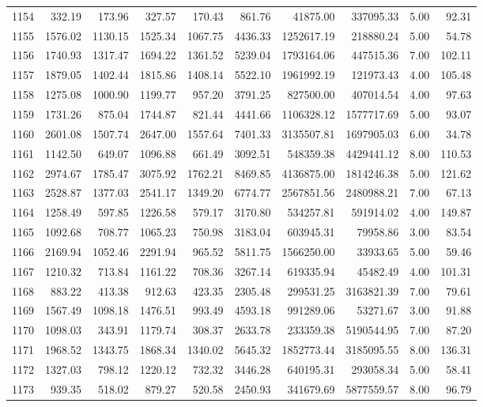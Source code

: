 \begin{tabular}{lrrrrrrrrr}
1154 & 332.19 & 173.96 & 327.57 & 170.43 & 861.76 & 41875.00 & 337095.33 & 5.00 & 92.31 \\
1155 & 1576.02 & 1130.15 & 1525.34 & 1067.75 & 4436.33 & 1252617.19 & 218880.24 & 5.00 & 54.78 \\
1156 & 1740.93 & 1317.47 & 1694.22 & 1361.52 & 5239.04 & 1793164.06 & 447515.36 & 7.00 & 102.11 \\
1157 & 1879.05 & 1402.44 & 1815.86 & 1408.14 & 5522.10 & 1961992.19 & 121973.43 & 4.00 & 105.48 \\
1158 & 1275.08 & 1000.90 & 1199.77 & 957.20 & 3791.25 & 827500.00 & 407014.54 & 4.00 & 97.63 \\
1159 & 1731.26 & 875.04 & 1744.87 & 821.44 & 4441.66 & 1106328.12 & 1577717.69 & 5.00 & 93.07 \\
1160 & 2601.08 & 1507.74 & 2647.00 & 1557.64 & 7401.33 & 3135507.81 & 1697905.03 & 6.00 & 34.78 \\
1161 & 1142.50 & 649.07 & 1096.88 & 661.49 & 3092.51 & 548359.38 & 4429441.12 & 8.00 & 110.53 \\
1162 & 2974.67 & 1785.47 & 3075.92 & 1762.21 & 8469.85 & 4136875.00 & 1814246.38 & 5.00 & 121.62 \\
1163 & 2528.87 & 1377.03 & 2541.17 & 1349.20 & 6774.77 & 2567851.56 & 2480988.21 & 7.00 & 67.13 \\
1164 & 1258.49 & 597.85 & 1226.58 & 579.17 & 3170.80 & 534257.81 & 591914.02 & 4.00 & 149.87 \\
1165 & 1092.68 & 708.77 & 1065.23 & 750.98 & 3183.04 & 603945.31 & 79958.86 & 3.00 & 83.54 \\
1166 & 2169.94 & 1052.46 & 2291.94 & 965.52 & 5811.75 & 1566250.00 & 33933.65 & 5.00 & 59.46 \\
1167 & 1210.32 & 713.84 & 1161.22 & 708.36 & 3267.14 & 619335.94 & 45482.49 & 4.00 & 101.31 \\
1168 & 883.22 & 413.38 & 912.63 & 423.35 & 2305.48 & 299531.25 & 3163821.39 & 7.00 & 79.61 \\
1169 & 1567.49 & 1098.18 & 1476.51 & 993.49 & 4593.18 & 991289.06 & 53271.67 & 3.00 & 91.88 \\
1170 & 1098.03 & 343.91 & 1179.74 & 308.37 & 2633.78 & 233359.38 & 5190544.95 & 7.00 & 87.20 \\
1171 & 1968.52 & 1343.75 & 1868.34 & 1340.02 & 5645.32 & 1852773.44 & 3185095.55 & 8.00 & 136.31 \\
1172 & 1327.03 & 798.12 & 1220.12 & 732.32 & 3446.28 & 640195.31 & 293058.34 & 5.00 & 58.41 \\
1173 & 939.35 & 518.02 & 879.27 & 520.58 & 2450.93 & 341679.69 & 5877559.57 & 8.00 & 96.79 \\

\end{tabular}
